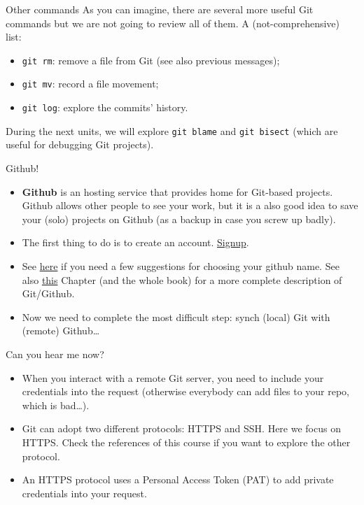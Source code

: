 \documentclass[
hyperref={bookmarks=false},
xcolor={dvipsnames,svgnames*,x11names*}, 
12pt
]{beamer}
\begin{document}
\begin{frame}{Other commands}
\vspace{-0.5cm}
As you can imagine, there are several more useful Git commands but we are not going to review all of them. A (not-comprehensive) list: 
\begin{itemize}
\itemsep 2ex
\item \texttt{git rm}: remove a file from Git (see also previous messages); 
\item \texttt{git mv}: record a file movement; 
\item \texttt{git log}: explore the commits' history.
\end{itemize}
During the next units, we will explore \texttt{git blame} and \texttt{git bisect} (which are useful for debugging Git projects). 
\end{frame}

\begin{frame}{Github!}
\vspace{-0.5cm}
\begin{itemize}
\itemsep 2ex
\item \textbf{Github} is an hosting service that provides home for Git-based projects. Github allows other people to see your work, but it is a also good idea to save your (solo) projects on Github (as a backup in case you screw up badly). 
\item The first thing to do is to create an account. \href{https://github.com/signup?ref_cta=Sign+up\&ref_loc=header+logged+out\&ref_page=\%2F\&source=header-home}{Signup}. 
\item See \href{https://happygitwithr.com/github-acct.html}{here} if you need a few suggestions for choosing your github name. See also \href{https://happygitwithr.com/big-picture.html}{this} Chapter (and the whole book) for a more complete description of Git/Github.  
\item Now we need to complete the most difficult step: synch (local) Git with (remote) Github\dots
\end{itemize}
\end{frame}

\begin{frame}{Can you hear me now?}
\vspace{-0.5cm}
\begin{itemize}
\itemsep 2ex
\item When you interact with a remote Git server, you need to include your credentials into the request (otherwise everybody can add files to your repo, which is bad\dots). 
\item Git can adopt two different protocols: HTTPS and SSH. Here we focus on HTTPS. Check the references of this course if you want to explore the other protocol. 
\item An HTTPS protocol uses a Personal Access Token (PAT) to add private credentials into your request. 
\end{itemize}
\end{frame}
\end{document}
